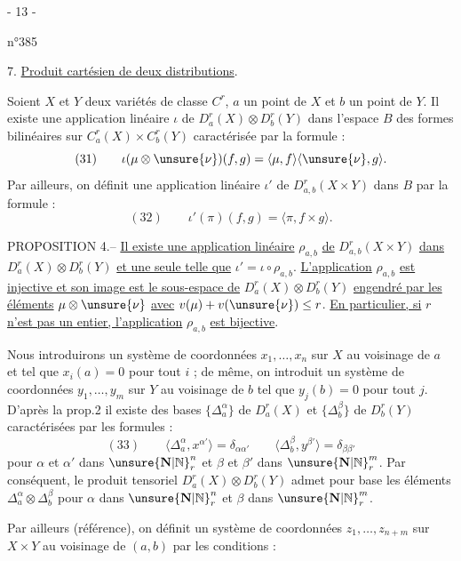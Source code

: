 \begin{center}- 13 -\end{center}
\begin{flushright}n°385\end{flushright}
7. \uline{Produit cartésien de deux distributions}.

Soient $X$ et $Y$ deux variétés de classe $C^r$, $a$ un point de $X$ et $b$ un point de $Y$.
Il existe une application linéaire $\iota$ de $D_a^r(X)\otimes D_b^r(Y)$ dans l'espace $B$ des formes bilinéaires sur $C_a^r(X)\times C_b^r(Y)$ caractérisée par la formule :
\[
(31)\qquad \iota(\mu\otimes\unsure{\nu})(f,g)=\langle\mu,f\rangle\langle\unsure{\nu},g\rangle.
\]
Par ailleurs, on définit une application linéaire $\iota'$ de $D_{a,b}^r(X\times Y)$ dans $B$ par la formule :
\[
(32)\qquad \iota'(\pi)(f,g)=\langle\pi,f\times g\rangle.
\]

PROPOSITION 4.-- \uline{Il existe une application linéaire} $\rho_{a,b}$ \uline{de} $D_{a,b}^r(X\times Y)$ \uline{dans} $D_a^r(X)\otimes D_b^r(Y)$ \uline{et une seule telle que} $\iota'=\iota\circ\rho_{a,b}$. \uline{L'application} $\rho_{a,b}$ \uline{est injective et son image est le sous-espace de} $D_a^r(X)\otimes D_b^r(Y)$ \uline{engendré par les éléments} $\mu\otimes\unsure{\nu}$ \uline{avec} $v(\mu)+v(\unsure{\nu})\leq r$. \uline{En particulier, si} $r$ \uline{n'est pas un entier, l'application} $\rho_{a,b}$ \uline{est bijective}.

Nous introduirons un système de coordonnées $x_1,\ldots,x_n$ sur $X$ au voisinage de $a$ et tel que $x_i(a)=0$ pour tout $i$ ; de même, on introduit un système de coordonnées $y_1,\ldots,y_m$ sur $Y$ au voisinage de $b$ tel que $y_j(b)=0$ pour tout $j$. D'après la prop.2 il existe des bases $\{\Delta_a^\alpha\}$ de $D_a^r(X)$ et $\{\Delta_b^\beta\}$ de $D_b^r(Y)$ caractérisées par les formules :
\[
(33)\qquad
\langle\Delta_a^\alpha,x^{\alpha'}\rangle=\delta_{\alpha\alpha'}
\qquad
\langle\Delta_b^\beta,y^{\beta'}\rangle=\delta_{\beta\beta'}
\]
pour $\alpha$ et $\alpha'$ dans $\unsure{\mathbf{N}|\mathbb{N}}_r^n$ et $\beta$ et $\beta'$ dans $\unsure{\mathbf{N}|\mathbb{N}}_r^m$. Par conséquent, le produit tensoriel $D_a^r(X)\otimes D_b^r(Y)$ admet pour base les éléments $\Delta_a^\alpha\otimes\Delta_b^\beta$ pour $\alpha$ dans $\unsure{\mathbf{N}|\mathbb{N}}_r^n$ et $\beta$ dans $\unsure{\mathbf{N}|\mathbb{N}}_r^m$.

Par ailleurs (référence), on définit un système de coordonnées $z_1,\ldots,z_{n+m}$ sur $X\times Y$ au voisinage de $(a,b)$ par les conditions :
